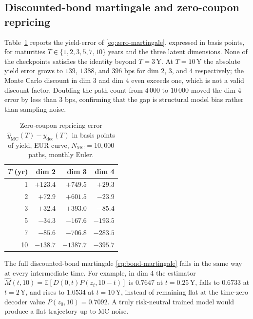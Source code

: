 \subsection{Discounted-bond martingale and zero-coupon repricing}
\label{subsec:simulation_diagnostics_results}

Table~\ref{tab:zero_repricing} reports the yield-error of \eqref{eq:zero-martingale}, expressed in basis points, for maturities $T\in\{1,2,3,5,7,10\}$ years and the three latent dimensions. None of the checkpoints satisfies the identity beyond $T=3$\,Y. At $T=10$\,Y the absolute yield error grows to $139$, $1\,388$, and $396$ bps for dim $2$, $3$, and $4$ respectively; the Monte Carlo discount in dim $3$ and dim $4$ even exceeds one, which is not a valid discount factor. Doubling the path count from $4\,000$ to $10\,000$ moved the dim 4 error by less than $3$ bps, confirming that the gap is structural model bias rather than sampling noise.

\begin{table}[ht]
  \centering
  \caption{Zero-coupon repricing error
    \(\hat y_{\mathrm{MC}}(T)-y_{\mathrm{dec}}(T)\) in basis points
    of yield, EUR curve, \(N_{\mathrm{MC}}=10{,}000\) paths,
    monthly Euler.}
  \label{tab:zero_repricing}
  \begin{tabular}{rrrr}
    \toprule
    $T$ (yr) & dim 2 & dim 3 & dim 4 \\
    \midrule
       1 & $+123.4$  &  $+749.5$ & $+29.3$  \\
       2 & $+72.9$   &  $+601.5$ & $-23.9$  \\
       3 & $+32.4$   &  $+393.0$ & $-85.4$  \\
       5 & $-34.3$   &  $-167.6$ & $-193.5$ \\
       7 & $-85.6$   &  $-706.8$ & $-283.5$ \\
      10 & $-138.7$  & $-1387.7$ & $-395.7$ \\
    \bottomrule
  \end{tabular}
\end{table}

The full discounted-bond martingale \eqref{eq:bond-martingale} fails in the same way at every intermediate time. For example, in dim 4 the estimator $\hat M(t,10)=\mathbb E[D(0,t)P(z_t,10-t)]$ is $0.7647$ at $t=0.25$\,Y, falls to $0.6733$ at $t=2$\,Y, and rises to $1.0534$ at $t=10$\,Y, instead of remaining flat at the time-zero decoder value $P(z_0,10)=0.7092$. A truly risk-neutral trained model would produce a flat trajectory up to MC noise.

